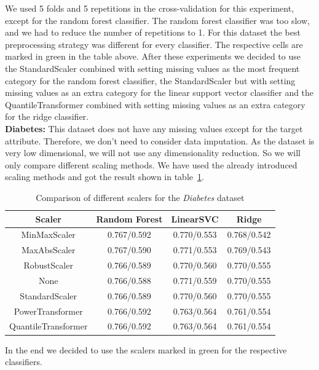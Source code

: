 \documentclass[a4paper,12pt]{article}
\begin{document}
We used 5 folds and 5 repetitions in the cross-validation for this experiment, except for the random forest
classifier. The random forest classifier was too slow, and we had to reduce the number of repetitions to 1.
For this dataset the best
preprocessing strategy was different for every classifier. The respective cells are marked in green in the
table above. After these experiments we decided to use the StandardScaler combined with setting missing
values as the most frequent category for the random forest classifier, the StandardScaler but with setting
missing values as an extra category for the linear support vector classifier and the QuantileTransformer
combined with setting missing values as an extra category for the ridge classifier.\\
\textbf{Diabetes:} This dataset does not have any missing values except for the target attribute. Therefore, we 
 don't need to consider data imputation. As the dataset is very low dimensional, we will not use any dimensionality reduction. 
 So we will only compare different scaling methods. We have used the already introduced scaling methods 
 and got the result shown in table~\ref{table:diabetesscalers}.
 \begin{table}[h!]
\centering
\begin{tabular}{|c|c|c|c|}
\hline
\textbf{Scaler} & \textbf{Random Forest } & \textbf{LinearSVC } & \textbf{Ridge } \\
\hline
MinMaxScaler & \cellcolor[HTML]{C1E1C1}0.767/0.592 & 0.770/0.553 & 0.768/0.542 \\
\hline
MaxAbsScaler & 0.767/0.590 & 0.771/0.553 & 0.769/0.543 \\
\hline
RobustScaler & 0.766/0.589 & 0.770/0.560 & 0.770/0.555 \\
\hline
None & 0.766/0.588 & \cellcolor[HTML]{C1E1C1}0.771/0.559 & 0.770/0.555 \\
\hline
StandardScaler & 0.766/0.589 & 0.770/0.560 & \cellcolor[HTML]{C1E1C1}0.770/0.555 \\
\hline
PowerTransformer & 0.766/0.592 & 0.763/0.564 & 0.761/0.554 \\
\hline
QuantileTransformer & 0.766/0.592 & 0.763/0.564 & 0.761/0.554 \\
\hline
\end{tabular}
\caption{Comparison of different scalers for the \textit{Diabetes} dataset}
\label{table:diabetesscalers}
\end{table}
In the end we decided to use the scalers marked in green for the respective classifiers.\\
\end{document}
